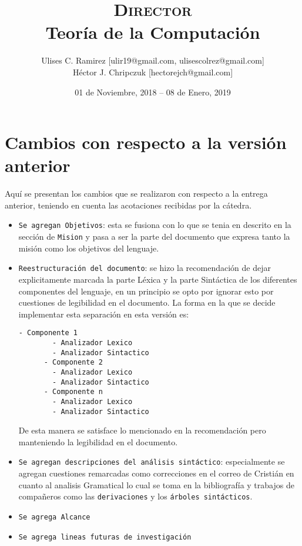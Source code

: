 \documentclass{report}
\title{\textsc{Director}\\Teoría de la Computación}
\author{Ulises C. Ramirez [ulir19@gmail.com, ulisescolrez@gmail.com]\\Héctor J.
Chripczuk [hectorejch@gmail.com]}
\date{01 de Noviembre, 2018 -- 08 de Enero, 2019}
\begin{document}
\maketitle
{}
\newpage

\section*{Cambios con respecto a la versión anterior}

Aquí se presentan los cambios que se realizaron con respecto a la entrega
anterior, teniendo en cuenta las acotaciones recibidas por la cátedra.

\begin{itemize}
  \item \texttt{Se agregan Objetivos}: esta se fusiona con lo que se tenia en
    descrito en la sección de \texttt{Mision} y pasa a ser la parte del documento
    que expresa tanto la misión como los objetivos del lenguaje.
  \item \texttt{Reestructuración del documento}:
    se hizo la recomendación de dejar explicitamente marcada la parte Léxica y
    la parte Sintáctica de los diferentes componentes del lenguaje, en un
    principio se opto por ignorar esto por cuestiones de legibilidad en el
    documento.
    La forma en la que se decide implementar esta separación en esta versión
    es:
    \begin{lstlisting}[basicstyle=\footnotesize]
      - Componente 1
        - Analizador Lexico
        - Analizador Sintactico
      - Componente 2
        - Analizador Lexico
        - Analizador Sintactico
      - Componente n
        - Analizador Lexico
        - Analizador Sintactico
    \end{lstlisting}

    De esta manera se satisface lo mencionado en la recomendación pero
    manteniendo la legibilidad en el documento.
  \item \texttt{Se agregan descripciones del análisis sintáctico}:
    especialmente se agregan cuestiones remarcadas como correcciones en el
    correo de Cristián en cuanto al analisis Gramatical lo cual se toma en la
    bibliografía y trabajos de compañeros como las \texttt{derivaciones} y los
    \texttt{árboles sintácticos}.
  \item \texttt{Se agrega Alcance}
  \item \texttt{Se agrega lineas futuras de investigación}
\end{itemize}
\end{document}
